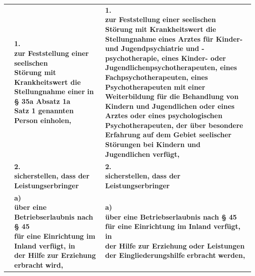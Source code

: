 \documentclass[10pt,a4paper,landscape]{article}
\begin{document}
\begin{longtable}{|L{8.2cm}|L{8.2cm}|L{8.2cm}|}
 & \textbf{1.   \newline zur Feststellung einer seelischen  \newline Störung mit Krankheitswert die  \newline Stellungnahme einer }\textbf{\textcolor{diffred}{in \S{} 35a Absatz 1a  \newline Satz 1 genannten Person einholen,}} & \textbf{1.   \newline zur Feststellung einer seelischen  \newline Störung mit Krankheitswert die  \newline Stellungnahme }\textbf{\textcolor{diffgreen}{eines Arztes für Kinder-  \newline und Jugendpsychiatrie und - \newline psychotherapie, eines Kinder- oder  \newline Jugendlichenpsychotherapeuten, eines  \newline Fachpsychotherapeuten, eines  \newline Psychotherapeuten mit}}\textbf{ einer} \newline \textbf{\textcolor{diffgreen}{Weiterbildung für die Behandlung von  \newline Kindern und Jugendlichen oder eines  \newline Arztes oder eines psychologischen  \newline Psychotherapeuten, der über besondere  \newline Erfahrung auf dem Gebiet seelischer  \newline Störungen bei Kindern und  \newline Jugendlichen verfügt,}} \\
\hhline{|---|}
 & \textbf{2.   \newline sicherstellen, dass der  \newline Leistungserbringer } & \textbf{2.   \newline sicherstellen, dass der  \newline Leistungserbringer } \\
\hhline{|---|}
 & \textbf{a)   \newline über eine Betriebserlaubnis nach \S{} 45  \newline für eine Einrichtung im Inland verfügt, in  \newline der Hilfe zur Erziehung erbracht }\textbf{\textcolor{diffred}{wird,}} & \textbf{a)   \newline über eine Betriebserlaubnis nach \S{} 45  \newline für eine Einrichtung im Inland verfügt, in  \newline der Hilfe zur Erziehung }\textbf{\textcolor{diffgreen}{oder Leistungen  \newline der Eingliederungshilfe}}\textbf{ erbracht} \newline \textbf{\textcolor{diffgreen}{werden,}} \\

\end{longtable}
\end{document}

